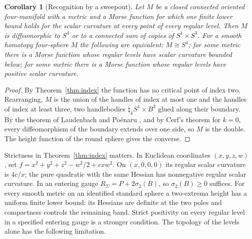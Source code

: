 \documentclass[11pt,letterpaper]{article}
\numberwithin{equation}{section}
\newtheorem{corollary}[theorem]{Corollary}
\theoremstyle{definition}
\begin{document}
\begin{corollary}[Recognition by a sweepout]\label{cor:sweepout}
Let \(M\) be a closed connected oriented four-manifold with a metric and a
Morse function for which one finite lower bound holds for the scalar curvature
at every point of every regular level. Then \(M\) is diffeomorphic to \(S^4\) or to a connected sum of
copies of \(S^1\times S^3\). For a smooth homotopy four-sphere \(M\) the
following are equivalent: \(M\cong S^4\); for some metric there is a Morse
function whose regular levels have scalar curvature bounded below; for
some metric there is a Morse function whose regular levels have positive
scalar curvature.
\end{corollary}
\begin{proof}
By Theorem~\ref{thm:index} the function has no critical point of index
two. Rearranging, \(M\) is the union of the handles of index at most one
and the handles of index at least three, two handlebodies
\(\natural_kS^1\times B^3\) glued along their boundary. By the theorem of
Laudenbach and Po\'enaru \cite{LaudenbachPoenaru1972Handlebodies}, and by
Cerf's theorem \cite{Cerf1968Gamma4} for \(k=0\), every diffeomorphism of
the boundary extends over one side, so \(M\) is the double. The height
function of the round sphere gives the converse.
\end{proof}

Strictness in Theorem~\ref{thm:index} matters. In Euclidean
coordinates \((x,y,z,w)\), set
\(f=x^2+y^2+z^2-w^2/2+cxw^2\). On \((x,0,0,0)\) its regular scalar
curvature is \(4c/x\); the pure quadratic with the same Hessian has
nonnegative regular scalar curvature. In an entering gauge
\(R_\Sigma=P+2\sigma_2(B)\), so \(\sigma_2(B)\ge0\) suffices. For every
smooth metric on an identified standard sphere a two-extrema height has
a uniform finite lower bound: its Hessians are definite at the two
poles and compactness controls the remaining band. Strict positivity
on every regular level in a specified entering gauge is a stronger
condition. The topology of the levels alone has the following limitation.
\end{document}
